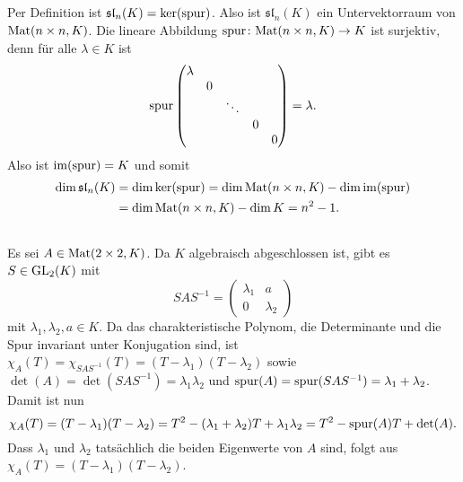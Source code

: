 \documentclass[a4paper,10pt]{article}
\begin{document}
\subsection{}
Per Definition ist $\mathfrak{sl}_n(K) = \ker(\mathrm{spur})$. Also ist $\mathfrak{sl}_n(K)$ ein Untervektorraum von $\mathrm{Mat}(n \times n, K)$. Die lineare Abbildung $\mathrm{spur} \colon \mathrm{Mat}(n \times n, K) \to K$ ist surjektiv, denn für alle $\lambda \in K$ ist
\[
 \mathrm{spur}
 \begin{pmatrix}
  \lambda &   &        &   &   \\
          & 0 &        &   &   \\
          &   & \ddots &   &   \\
          &   &        & 0 &   \\
          &   &        &   & 0
 \end{pmatrix}
 = \lambda.
\]
Also ist $\mathrm{im}(\mathrm{spur}) = K$ und somit
\begin{align*}
 \dim \mathfrak{sl}_n(K)
 &= \dim \ker(\mathrm{spur})
 = \dim \mathrm{Mat}(n \times n, K) - \dim \mathrm{im}(\mathrm{spur}) \\
 &= \dim \mathrm{Mat}(n \times n, K) - \dim K
 = n^2 - 1.
\end{align*}


\subsection{}
Es sei $A \in \mathrm{Mat}(2 \times 2, K)$. Da $K$ algebraisch abgeschlossen ist, gibt es $S \in \mathrm{GL}_2(K)$ mit
\[
 SAS^{-1} =
 \begin{pmatrix}
  \lambda_1 & a \\
  0         & \lambda_2
 \end{pmatrix}
\]
mit $\lambda_1, \lambda_2, a \in K$. Da das charakteristische Polynom, die Determinante und die Spur invariant unter Konjugation sind, ist $\chi_A(T) = \chi_{SAS^{-1}}(T) = (T-\lambda_1)(T-\lambda_2)$ sowie $\det(A) = \det(SAS^{-1}) = \lambda_1 \lambda_2$ und $\mathrm{spur}(A) = \mathrm{spur}(SAS^{-1}) = \lambda_1 + \lambda_2$. Damit ist nun
\[
 \chi_A(T)
 = (T-\lambda_1)(T-\lambda_2)
 = T^2 - (\lambda_1 + \lambda_2)T + \lambda_1 \lambda_2
 = T^2 - \mathrm{spur}(A)T + \det(A).
\]
Dass $\lambda_1$ und $\lambda_2$ tatsächlich die beiden Eigenwerte von $A$ sind, folgt aus $\chi_A(T) = (T-\lambda_1)(T-\lambda_2)$.
\end{document}
